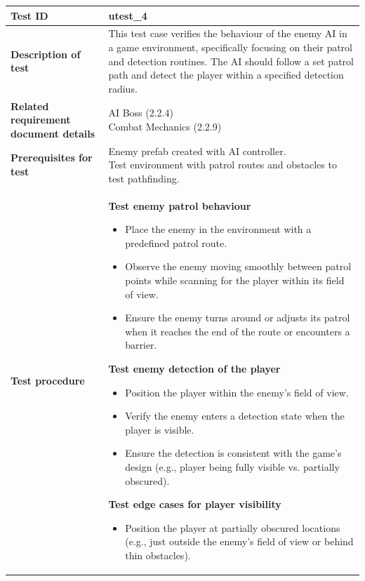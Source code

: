 \documentclass[11pt, a4paper]{article}
\begin{document}
\begin{center}
\begin{tabularx}{\linewidth}{|>{\raggedright\arraybackslash}m{4cm}|X|}
    \hline
    \textbf{Test ID} & utest\_4 \\
    \hline
    \textbf{Description of test} & This test case verifies the behaviour of the enemy AI in a game environment, specifically focusing on their patrol and detection routines. The AI should follow a set patrol path and detect the player within a specified detection radius. \\
    \hline
    \textbf{Related requirement document details} & \makecell[l] {
        AI Boss (2.2.4) \\
        Combat Mechanics (2.2.9)
    } \\
    \hline
    \textbf{Prerequisites for test} & \makecell[l] {
        Enemy prefab created with AI controller. \\
        Test environment with patrol routes and obstacles to test pathfinding.
    } \\
    \hline
    \textbf{Test procedure} &
    \textbf{Test enemy patrol behaviour}
    \begin{itemize}
        \item Place the enemy in the environment with a predefined patrol route.
        \item Observe the enemy moving smoothly between patrol points while scanning for the player within its field of view.
        \item Ensure the enemy turns around or adjusts its patrol when it reaches the end of the route or encounters a barrier.
    \end{itemize}
    \textbf{Test enemy detection of the player}
    \begin{itemize}
        \item Position the player within the enemy’s field of view.
        \item Verify the enemy enters a detection state when the player is visible.
        \item Ensure the detection is consistent with the game’s design (e.g., player being fully visible vs. partially obscured).
    \end{itemize}
    \textbf{Test edge cases for player visibility}
    \begin{itemize}
        \item Position the player at partially obscured locations (e.g., just outside the enemy’s field of view or behind thin obstacles).

\end{itemize}
\end{tabularx}
\end{center}
\end{document}
